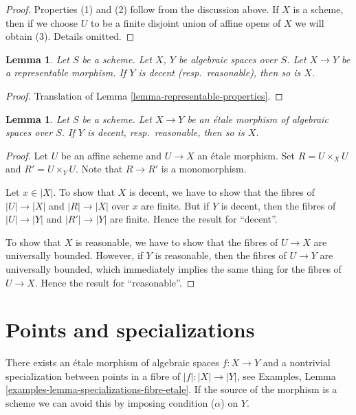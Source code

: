 \documentclass{stacks-project}
\theoremstyle{plain}
\newtheorem{lemma}[subsection]{Lemma}
\theoremstyle{definition}
\theoremstyle{remark}
\numberwithin{equation}{subsection}
\begin{document}
\begin{proof}
\medskip\noindent
Properties (1) and (2) follow from the discussion above.
If $X$ is a scheme, then if we choose $U$ to be a finite
disjoint union of affine opens of $X$ we will obtain (3).
Details omitted.
\end{proof}

\begin{lemma}
\label{lemma-representable-named-properties}
Let $S$ be a scheme. Let $X$, $Y$ be algebraic spaces over $S$.
Let $X \to Y$ be a representable morphism.
If $Y$ is decent (resp.\ reasonable), then so is $X$.
\end{lemma}

\begin{proof}
Translation of Lemma \ref{lemma-representable-properties}.
\end{proof}

\begin{lemma}
\label{lemma-etale-named-properties}
Let $S$ be a scheme. Let $X \to Y$ be an \'etale morphism of
algebraic spaces over $S$. If $Y$ is decent, resp.\ reasonable,
then so is $X$.
\end{lemma}

\begin{proof}
Let $U$ be an affine scheme and $U \to X$ an \'etale morphism.
Set $R = U \times_X U$ and $R' = U \times_Y U$. Note that
$R \to R'$ is a monomorphism.

\medskip\noindent
Let $x \in |X|$. To show that $X$ is decent, we have to show that
the fibres of $|U| \to |X|$ and $|R| \to |X|$ over $x$ are finite.
But if $Y$ is decent, then the fibres of $|U| \to |Y|$ and
$|R'| \to |Y|$ are finite. Hence the result for ``decent''.

\medskip\noindent
To show that $X$ is reasonable, we have to show that the fibres of
$U \to X$ are universally bounded. However, if $Y$ is reasonable,
then the fibres of $U \to Y$ are universally bounded, which immediately
implies the same thing for the fibres of $U \to X$.
Hence the result for ``reasonable''.
\end{proof}







\section{Points and specializations}
\label{section-specializations}

\noindent
There exists an \'etale morphism of algebraic spaces $f : X \to Y$
and a nontrivial specialization between points in a fibre of
$|f| : |X| \to |Y|$, see
Examples, Lemma \ref{examples-lemma-specializations-fibre-etale}.
If the source of the morphism is a scheme we can avoid this by
imposing condition ($\alpha$) on $Y$.
\end{document}
